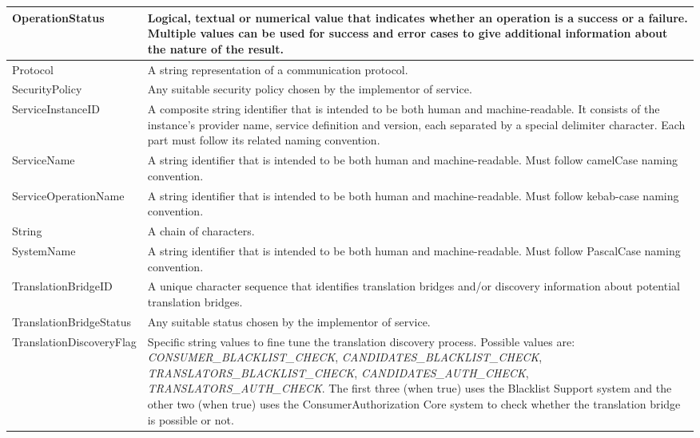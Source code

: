 \documentclass[a4paper]{arrowhead}
\newcommand{\pdef}[1]{{\textcolor{ArrowheadGrey}{#1\label{sec:model:primitives:#1}\label{sec:model:primitives:#1s}\label{sec:model:primitives:#1es}}}}
\begin{document}
\begin{table}[ht!]
\begin{tabularx}{\textwidth}{| p{5cm} | X |} \hline
\pdef{OperationStatus}  & Logical, textual or numerical value that indicates whether an operation is a success or a failure. Multiple values can be used for success and error cases to give additional information about the nature of the result. \\ \hline
\pdef{Protocol}         & A string representation of a communication protocol. \\ \hline
\pdef{SecurityPolicy}   & Any suitable security policy chosen by the implementor of service. \\ \pdef{ServiceInstanceID} & A composite string identifier that is intended to be both human and machine-readable. It consists of the instance's provider name, service definition and version, each separated by a special delimiter character. Each part must follow its related naming convention. \\ \hline
\pdef{ServiceName}      & A string identifier that is intended to be both human and machine-readable. Must follow camelCase naming convention. \\ \hline
\pdef{ServiceOperationName} & A string identifier that is intended to be both human and machine-readable. Must follow kebab-case naming convention. \\ \hline
\pdef{String}           & A chain of characters. \\ \hline
\pdef{SystemName}       & A string identifier that is intended to be both human and machine-readable. Must follow PascalCase naming convention. \\ \hline
\pdef{TranslationBridgeID} & A unique character sequence that identifies translation bridges and/or discovery information about potential translation bridges. \\ \hline
\pdef{TranslationBridgeStatus} & Any suitable status chosen by the implementor of service. \\ \hline
\pdef{TranslationDiscoveryFlag} & Specific string values to fine tune the translation discovery process. Possible values are: \textit{CONSUMER\_BLACKLIST\_CHECK}, \textit{CANDIDATES\_BLACKLIST\_CHECK}, \textit{TRANSLATORS\_BLACKLIST\_CHECK}, \textit{CANDIDATES\_AUTH\_CHECK},  \textit{TRANSLATORS\_AUTH\_CHECK}. The first three (when true) uses the Blacklist Support system and the other two (when true) uses the ConsumerAuthorization Core system to check whether the translation bridge is possible or not. \\ \hline
\end{tabularx}
\end{table}
\end{document}
